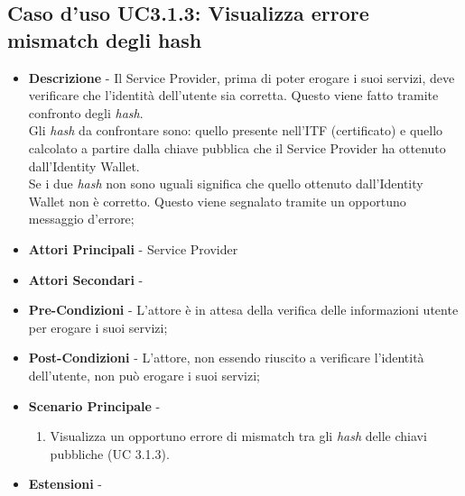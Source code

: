 \subsection{Caso d'uso UC3.1.3: Visualizza errore mismatch degli hash}
\begin{itemize}
	\item \textbf{Descrizione} - Il Service Provider, prima di poter erogare i suoi servizi, deve verificare che l'identità dell'utente sia corretta. Questo viene fatto tramite confronto degli \textit{hash}.\\
	Gli \textit{hash} da confrontare sono: quello presente nell'\gls{ITF} (certificato) e quello calcolato a partire dalla chiave pubblica che il Service Provider ha ottenuto dall'Identity Wallet.\\
	Se i due \textit{hash} non sono uguali significa che quello ottenuto dall'Identity Wallet non è corretto. Questo viene segnalato tramite un opportuno messaggio d'errore;
	\item \textbf{Attori Principali} - Service Provider
	\item \textbf{Attori Secondari} -
	\item \textbf{Pre-Condizioni} - L'attore è in attesa della verifica delle informazioni utente per erogare i suoi servizi;
	\item \textbf{Post-Condizioni} - L'attore, non essendo riuscito a verificare l'identità dell'utente, non può erogare i suoi servizi;
	\item \textbf{Scenario Principale} - 
	\begin{enumerate}
		\item Visualizza un opportuno errore di mismatch tra gli \textit{hash} delle chiavi pubbliche (UC 3.1.3).
	\end{enumerate}
	\item \textbf{Estensioni} -
\end{itemize}
